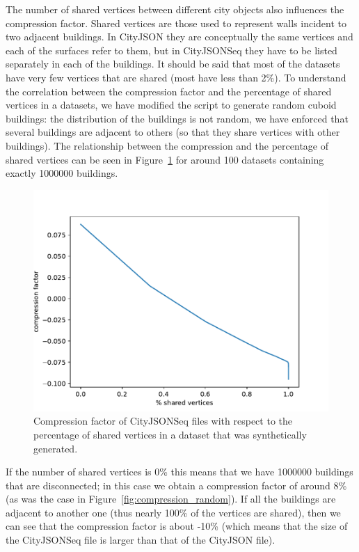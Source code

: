 \documentclass{isprs} %
\begin{document}
The number of shared vertices between different city objects also influences the compression factor. 
Shared vertices are those used to represent walls incident to two adjacent buildings.
In CityJSON they are conceptually the same vertices and each of the surfaces refer to them, but in CityJSONSeq they have to be listed separately in each of the buildings.
It should be said that most of the datasets have very few vertices that are shared (most have less than 2\%).
To understand the correlation between the compression factor and the percentage of shared vertices in a datasets, we have modified the script to generate random cuboid buildings: the distribution of the buildings is not random, we have enforced that several buildings are adjacent to others (so that they share vertices with other buildings).
The relationship between the compression and the percentage of shared vertices can be seen in Figure~\ref{fig:compression_adjacent} for around 100 datasets containing exactly \num{1000000} buildings.
\begin{figure}
  \centering
  \includegraphics[width=\linewidth]{figs/compression_adjacent.pdf}
  \caption{Compression factor of CityJSONSeq files with respect to the percentage of shared vertices in a dataset that was synthetically generated.}%
\label{fig:compression_adjacent}
\end{figure}
If the number of shared vertices is 0\% this means that we have \num{1000000} buildings that are disconnected; in this case we obtain a compression factor of around 8\% (as was the case in Figure~\ref{fig:compression_random}).
If all the buildings are adjacent to another one (thus nearly 100\% of the vertices are shared), then we can see that the compression factor is about -10\% (which means that the size of the CityJSONSeq file is larger than that of the CityJSON file).
%
\end{document}
